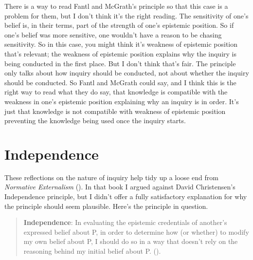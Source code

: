 \documentclass[
  10pt,
  letterpaper,
  twoside]{scrbook}
\begin{document}
There is a way to read Fantl and McGrath's principle so that this case
is a problem for them, but I don't think it's the right reading. The
sensitivity of one's belief is, in their terms, part of the strength of
one's epistemic position. So if one's belief was more sensitive, one
wouldn't have a reason to be chasing sensitivity. So in this case, you
might think it's weakness of epistemic position that's relevant; the
weakness of epistemic position explains why the inquiry is being
conducted in the first place. But I don't think that's fair. The
principle only talks about how inquiry should be conducted, not about
whether the inquiry should be conducted. So Fantl and McGrath could say,
and I think this is the right way to read what they do say, that
knowledge is compatible with the weakness in one's epistemic position
explaining why an inquiry is in order. It's just that knowledge is not
compatible with weakness of epistemic position preventing the knowledge
being used once the inquiry starts.

\section{Independence}\label{sec-independence}

These reflections on the nature of inquiry help tidy up a loose end from
\emph{Normative Externalism} (). In that book I argued against David Christensen's Independence
principle, but I didn't offer a fully satisfactory explanation for why
the principle should seem plausible. Here's the principle in question.

\begin{quote}
\textbf{Independence}: In evaluating the epistemic credentials of
another's expressed belief about P, in order to determine how (or
whether) to modify my own belief about P, I should do so in a way that
doesn't rely on the reasoning behind my initial belief about P.
().
\end{quote}
\end{document}
